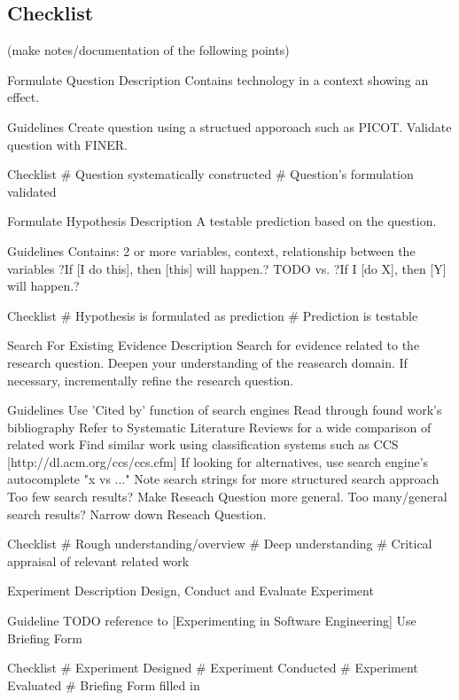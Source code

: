 
\newpage
\subsection{Checklist}

(make notes/documentation of the following points)


Formulate Question
	Description
		Contains technology in a context showing an effect.
	
	Guidelines
		Create question using a structued apporoach such as PICOT. 
		Validate question with FINER.
	
	Checklist
		\# Question systematically constructed
		\# Question's formulation validated			
				
				
Formulate Hypothesis
	Description
		A testable prediction based on the question.

	Guidelines
		Contains: 2 or more variables, context, relationship between the variables
		?If [I do this], then [this] will happen.? TODO vs. ?If I [do X], then [Y] will happen.?
		
	Checklist
		\# Hypothesis is formulated as prediction
		\# Prediction is testable
		
Search For Existing Evidence
	Description
		Search for evidence related to the research question.
		Deepen your understanding of the reasearch domain.
		If necessary, incrementally refine the research question.
	
	Guidelines
		Use 'Cited by' function of search engines
		Read through found work's bibliography
		Refer to Systematic Literature Reviews for a wide comparison of related work
		Find similar work using classification systems such as CCS [http://dl.acm.org/ccs/ccs.cfm]
		If looking for alternatives, use search engine's autocomplete "x vs ..."
		Note search strings for more structured search approach
		Too few search results? Make Reseach Question more general.
		Too many/general search results? Narrow down Reseach Question.
		
	Checklist
		\# Rough understanding/overview
		\# Deep understanding
		\# Critical appraisal of relevant related work
	
	
Experiment	
	Description
		Design, Conduct and Evaluate Experiment
	
	Guideline
		TODO reference to [Experimenting in Software Engineering]
		Use Briefing Form
		
	Checklist
		\# Experiment Designed
		\# Experiment Conducted
		\# Experiment Evaluated
		\# Briefing Form filled in
		

